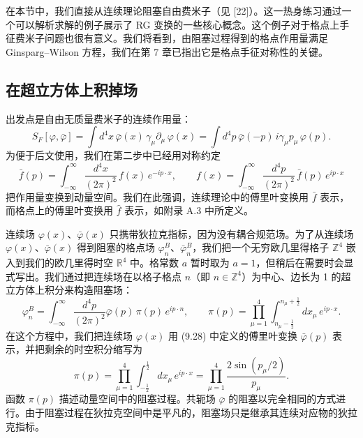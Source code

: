 在本节中，我们直接从连续理论阻塞自由费米子（见 [22]）。这一热身练习通过一个可以解析求解的例子展示了 RG 变换的一些核心概念。这个例子对于格点上手征费米子问题也很有意义。我们将看到，由阻塞过程得到的格点作用量满足 Ginsparg--Wilson 方程，我们在第 7 章已指出它是格点手征对称性的关键。

\subsection{在超立方体上积掉场}
\label{sec:9.2.1}

出发点是自由无质量费米子的连续作用量：
\begin{equation}
  S_F[\varphi,\bar\varphi] = \int d^4x\,\bar\varphi(x)\,\gamma_\mu\partial_\mu\,\varphi(x)
  = \int d^4p\,\bar\varphi(-p)\,i\gamma_\mu p_\mu\,\varphi(p) .
\end{equation}
为便于后文使用，我们在第二步中已经用对称约定
\begin{equation}
  \bar f(p) = \int_{-\infty}^{\infty}\frac{d^4x}{(2\pi)^2}\,f(x)\,e^{-ip\cdot x} ,
  \qquad
  f(x) = \int_{-\infty}^{\infty}\frac{d^4p}{(2\pi)^2}\,\bar f(p)\,e^{ip\cdot x}
\end{equation}
把作用量变换到动量空间。我们在此强调，连续理论中的傅里叶变换用 $\bar f$ 表示，而格点上的傅里叶变换用 $\hat f$ 表示，如附录 A.3 中所定义。

连续场 $\varphi(x)$、$\bar\varphi(x)$ 只携带狄拉克指标，因为没有耦合规范场。为了从连续场 $\varphi(x)$、$\bar\varphi(x)$ 得到阻塞的格点场 $\varphi^B_n$、$\bar\varphi^B_n$，我们把一个无穷欧几里得格子 $\mathbb{Z}^4$ 嵌入到我们的欧几里得时空 $\mathbb{R}^4$ 中。格常数 $a$ 暂时取为 $a = 1$，但稍后在需要时会显式写出。我们通过把连续场在以格子格点 $n$（即 $n \in \mathbb{Z}^4$）为中心、边长为 1 的超立方体上积分来构造阻塞场：
\begin{equation}
  \varphi^B_n = \int_{-\infty}^{\infty}\frac{d^4p}{(2\pi)^2}
    \bar\varphi(p)\,\pi(p)\,e^{ip\cdot n} ,
  \qquad
  \pi(p) = \prod_{\mu=1}^4\int_{n_\mu-\frac{1}{2}}^{n_\mu+\frac{1}{2}}dx_\mu\,e^{ip\cdot x} .
\end{equation}
在这个方程中，我们把连续场 $\varphi(x)$ 用 (9.28) 中定义的傅里叶变换 $\bar\varphi(p)$ 表示，并把剩余的时空积分缩写为
\begin{equation}
  \pi(p) = \prod_{\mu=1}^4\int_{-\frac{1}{2}}^{\frac{1}{2}}dx_\mu\,e^{ip\cdot x}
  = \prod_{\mu=1}^4\frac{2\sin(p_\mu/2)}{p_\mu} .
\end{equation}
函数 $\pi(p)$ 描述动量空间中的阻塞过程。共轭场 $\bar\varphi$ 的阻塞以完全相同的方式进行。由于阻塞过程在狄拉克空间中是平凡的，阻塞场只是继承其连续对应物的狄拉克指标。

